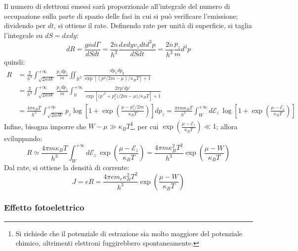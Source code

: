 \documentclass[10pt, a4paper]{scrartcl}
\numberwithin{equation}{subsection}
\theoremstyle{style1}
\begin{document}
Il numero di elettroni emessi sar\`a proporzionale all'integrale del numero di occupazione sulla parte di spazio delle fasi in cui si pu\`o verificare l'emissione;
dividendo per $dt$, si ottiene il rate.
Definendo rate per unit\`a di superficie, si taglia l'integrale su $dS = dxdy$:
\begin{equation*}
			dR = \frac{g \overline{n} d\Gamma}{dS dt} = \frac{2 \overline{n}}{h^3} \frac{dxdy v_z dt d^3 p}{dS dt}= \frac{2\overline{n}}{h^3}\frac{p_z }{m} d^3p
\end{equation*}
quindi:
\begin{equation*}
  			\begin{split}
			 R &= \frac{2}{h^3} \int_{\sqrt{2m W} } ^{+\infty} \frac{p_z dp_z}{m} \iint_{\mathbb{R}^2}  \frac{dp_x dp_y}{\exp \left[ (p^2 / 2m - \mu ) / \kappa _ B T \right] + 1} \\
					      &= \frac{2}{h^3} \int_{\sqrt{2m W} } ^{+\infty} \frac{p_z dp_z}{m} \int_{0} ^{+\infty} \frac{2\pi p ' dp'}{\exp \left[ \big(p'^2 + p_z^2)/ 2m - \mu \big) / \kappa _ B T \right] + 1} \\
					      &= \frac{4\pi \kappa _B T }{h^3}\int_{\sqrt{2mW} } ^{+\infty} p_z\log \left[ 1+ \exp\left(\frac{\mu  - p_z^2 / 2m}{\kappa _B T}\right)  \right] dp_z  =  \frac{4 \pi m \kappa _B T }{h^3} \int_{W} ^{+\infty} d \mathscr{E}_z \ \log \left[ 1+ \exp \left(\frac{\mu - \mathscr{E}_z}{\kappa _B T}\right)  \right] 
			\end{split}
\end{equation*}
Infine, bisogna imporre che $W - \mu  \gg \kappa _B T$\footnote{Si richiede che il potenziale di estrazione sia molto maggiore del potenziale chimico, altrimenti elettroni fuggirebbero spontaneamente.}, per cui $\exp\left(\frac{\mu  - \mathscr{E}_z}{\kappa _B T}\right) \ll 1$; allora sviluppando:
\begin{equation}
	R \simeq \frac{4\pi m \kappa _B T }{h^3}\int_{W} ^{+\infty} d \mathscr{E}_z\ \exp\left( \frac{\mu  - \mathscr{E}_z}{\kappa _B T}\right) = \frac{4\pi m \kappa _B ^2 T^2}{h^3} \exp \left(\frac{\mu  - W}{\kappa _B T}\right) 
\end{equation}
Dal rate, si ottiene la densit\`a di corrente:
\begin{equation}
	J = eR = \frac{4 \pi e m_e \kappa _B ^2 T^2}{h^3} \exp \left(\frac{\mu  - W}{\kappa _B T}\right) 
\end{equation}
\subsubsection{Effetto fotoelettrico}
\end{document}
